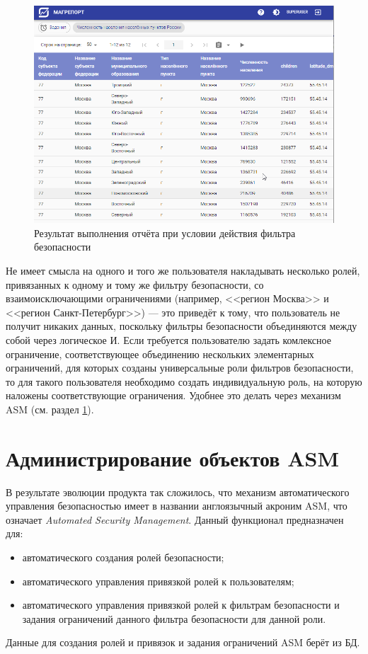 \documentclass[../user-manual.tex]{subfiles}
\begin{document}
	\begin{figure}[h]
		\centering
		\includegraphics[width=\graphicswidth]{img/16-sf-report-result.png}
		\caption{Результат выполнения отчёта при условии действия фильтра безопасности}
		\label{fig:sf-report-result}
	\end{figure}
	
	\begin{NB}
		Не имеет смысла на одного и того же пользователя накладывать несколько ролей, привязанных к одному и тому же фильтру безопасности, со взаимоисключающими ограничениями (например, <<регион Москва>> и <<регион Санкт-Петербург>>) --- это приведёт к тому, что пользователь не получит никаких данных, поскольку фильтры безопасности объединяются между собой через логическое И. Если требуется пользователю задать комлексное ограничение, соответствующее объединению нескольких элементарных ограничений, для которых созданы универсальные роли фильтров безопасности, то для такого пользователя необходимо создать индивидуальную роль, на которую наложены соответствующие ограничения. Удобнее это делать через механизм ASM (см. раздел \ref{administration:ASM}).
	\end{NB}
	
	\section{Администрирование объектов ASM}\label{administration:ASM}
	
	В результате эволюции продукта так сложилось, что механизм автоматического управления безопасностью имеет в названии англоязычный акроним ASM, что означает \textit{Automated Security Management}. Данный функционал предназначен для:
	\begin{itemize}
		\item автоматического создания ролей безопасности;
		\item автоматического управления привязкой ролей к пользователям;
		\item автоматического управления привязкой ролей к фильтрам безопасности и задания ограничений данного фильтра безопасности для данной роли.
	\end{itemize}
	Данные для создания ролей и привязок и задания ограничений ASM берёт из БД.
	
\end{document}

